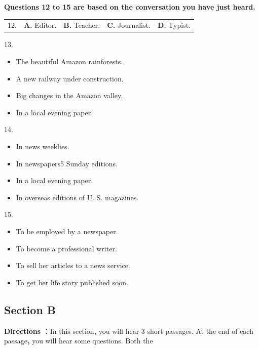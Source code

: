 \documentclass[UTF8,11pt]{ctexart}
\begin{document}
\textbf{Questions 12 to 15 are based on the conversation you have just heard.}


\noindent\begin{tabularx}{\linewidth}{@{}lXXXX@{}}12. & \textbf{A.} Editor. & \textbf{B.} Teacher. & \textbf{C.} Journalist. & \textbf{D.} Typist.\\\end{tabularx}\par

13.


\begin{itemize}[leftmargin=2em,itemsep=.2em,topsep=.4em]\item[A.] The beautiful Amazon rainforests.
\item[B.] A new railway under construction.
\item[C.] Big changes in the Amazon valley.
\item[D.] In a local evening paper.
\end{itemize}

14.


\begin{itemize}[leftmargin=2em,itemsep=.2em,topsep=.4em]\item[A.] In news weeklies.
\item[B.] In newspapers5 Sunday editions.
\item[C.] In a local evening paper.
\item[D.] In overseas editions of U. S. magazines.
\end{itemize}

15.


\begin{itemize}[leftmargin=2em,itemsep=.2em,topsep=.4em]\item[A.] To be employed by a newspaper.
\item[B.] To become a professional writer.
\item[C.] To sell her articles to a news service.
\item[D.] To get her life story published soon.
\end{itemize}

\subsection*{\textbf{Section B}}


\textbf{Directions} ：In this section\textbf{,} you will hear 3 short passages. At the end of each passage\textbf{,} you will hear some questions. Both the
\end{document}
